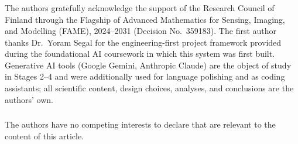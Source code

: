 \documentclass[runningheads]{llncs}
\begin{document}

\begin{credits}
\subsubsection*{\ackname}
The authors gratefully acknowledge the support of the Research Council
of Finland through the Flagship of Advanced Mathematics for Sensing,
Imaging, and Modelling (FAME), 2024--2031 (Decision No.\ 359183). The
first author thanks Dr.\ Yoram Segal for the engineering-first project
framework provided during the foundational AI coursework in which this
system was first built.
Generative AI tools (Google Gemini, Anthropic Claude) are the object of
study in Stages 2--4 and were additionally used for language polishing
and as coding assistants; all scientific content, design choices,
analyses, and conclusions are the authors' own.

\subsubsection*{\discintname}
The authors have no competing interests to declare that are relevant
to the content of this article.
\end{credits}
\end{document}
